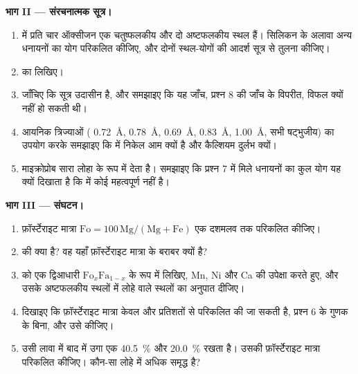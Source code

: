 \begin{problem}
\medskip
\noindent\textbf{भाग II --- संरचनात्मक सूत्र।}
\begin{enumerate}[resume]
  \item {} में प्रति चार ऑक्सीजन एक चतुष्फलकीय और दो अष्टफलकीय स्थल हैं। सिलिकन के अलावा अन्य धनायनों का योग परिकलित
        कीजिए, और दोनों स्थल-योगों की आदर्श सूत्र से तुलना कीजिए।
  \item {} का  लिखिए।
  \item जाँचिए कि सूत्र उदासीन है, और समझाइए कि यह जाँच, प्रश्न 8 की जाँच के विपरीत, विफल क्यों नहीं हो सकती थी।
  \item आयनिक त्रिज्याओं ( \qty{0.72}{\angstrom},  \qty{0.78}{\angstrom}, 
        \qty{0.69}{\angstrom},  \qty{0.83}{\angstrom},  \qty{1.00}{\angstrom}, सभी षट्भुजीय) का उपयोग करके
        समझाइए कि  में निकेल आम क्यों है और कैल्शियम दुर्लभ क्यों।
  \item माइक्रोप्रोब सारा लोहा  के रूप में देता है। समझाइए कि प्रश्न 7 में मिले धनायनों का कुल योग यह क्यों दिखाता है
        कि  में कोई महत्वपूर्ण  नहीं है।
\end{enumerate}

\medskip
\noindent\textbf{भाग III --- संघटन।}
\begin{enumerate}[resume]
  \item फ़ॉर्स्टेराइट मात्रा $\mathrm{Fo} = 100\,\mathrm{Mg}/(\mathrm{Mg} +
        \mathrm{Fe})$ एक दशमलव तक परिकलित कीजिए।
  \item {} की  क्या है? वह यहाँ फ़ॉर्स्टेराइट मात्रा के बराबर क्यों है?
  \item {} को एक द्विआधारी  $\mathrm{Fo}_x\mathrm{Fa}_{1-x}$ के रूप में लिखिए, Mn, Ni और Ca की उपेक्षा करते
        हुए, और उसके अष्टफलकीय स्थलों में लोहे वाले स्थलों का अनुपात दीजिए।
  \item दिखाइए कि फ़ॉर्स्टेराइट मात्रा केवल  और  प्रतिशतों से परिकलित की जा सकती है, प्रश्न 6 के गुणक के
        बिना, और उसे कीजिए।
  \item उसी लावा में बाद में उगा एक  \qty{40.5}{\percent}  और \qty{20.0}{\percent}  रखता है। उसकी
        फ़ॉर्स्टेराइट मात्रा परिकलित कीजिए। कौन-सा  लोहे में अधिक समृद्ध है?
\end{enumerate}


\end{problem}
